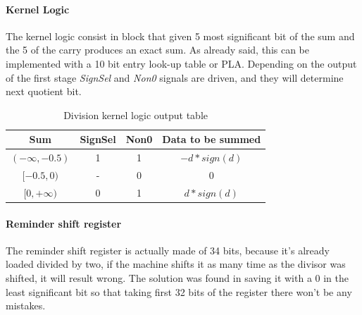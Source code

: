 \paragraph{Kernel Logic}
The kernel logic consist in block that given 5 most significant bit of the sum and the 5 of the carry produces an exact sum. As already said, this can be implemented with a 10 bit entry look-up table or PLA.
Depending on the output of the first stage \textit{SignSel} and \textit{Non0} signals are driven, and they will determine next quotient bit.
\begin{table}[H]
    \centering
    \begin{tabular}{c|c|c|c}
        Sum   & SignSel & Non0 & Data to be summed   \\
        \hline
        $(-\infty ,-0.5)$       &   1        &  1     & $-d*sign(d)$\\   
        $[-0.5,0)$    &      -     &  0      & 0              \\
        $[0,+\infty )$        &       0    &   1    &      $d*sign(d)$  \\
    \end{tabular}
    \caption{Division kernel logic output table}
    \label{tab:my_label}
\end{table}
\paragraph{Reminder shift register}
The reminder shift register is actually made of 34 bits, because it's already loaded divided by two, if the machine shifts it as many time as the divisor was shifted, it will result wrong. The solution was found in saving it with a 0 in the least significant bit so that taking first 32 bits of the register there won't be any mistakes.  


